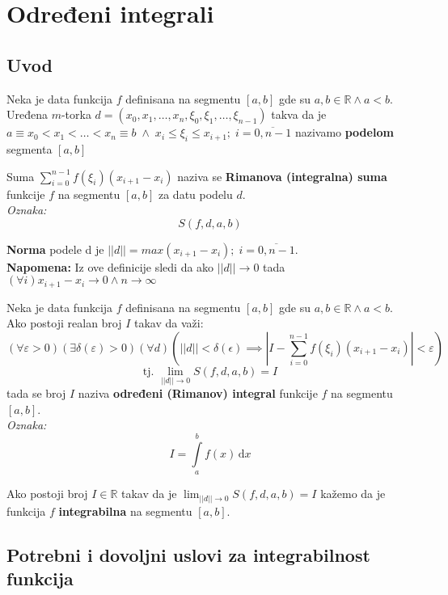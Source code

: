 \section{Određeni integrali}
\subsection{Uvod}
\begin{definition}
	Neka je data funkcija $f$ definisana na segmentu $[a, b]$ gde su $a, b \in \mathbb{R} \land a<b$. Uređena $m$-torka $d = (x_0, x_1, \ldots, x_n, \xi_0, \xi_1, \ldots, \xi_{n-1})$ takva da je $a \equiv x_0 < x_1 < \ldots < x_n \equiv b\; \land \;x_i \leq \xi_i \leq x_{i+1}; \; i=\overline{0, n-1}$ nazivamo \textbf{podelom} segmenta $[a, b]$
\end{definition}
\begin{definition}
	 Suma $\sum_{i=0}^{n-1} f(\xi_i)(x_{i+1}-x_i)$ naziva se \textbf{Rimanova (integralna) suma} funkcije $f$ na segmentu $[a, b]$ za datu podelu $d$.\\
	 \textit{Oznaka:} $$S(f, d, a, b)$$
\end{definition}
\begin{definition}
	\textbf{Norma} podele d je $||d|| = max(x_{i+1}-x_i); \; i=\overline{0,n-1}$.\\
	\textbf{Napomena:} Iz ove definicije sledi da ako $||d|| \to 0$ tada $(\forall i) x_{i+1}-x_i \to 0 \land n \to \infty$
\end{definition}
\begin{definition}
	Neka je data funkcija $f$ definisana na segmentu $[a, b]$ gde su $a, b \in \mathbb{R} \land a<b$. Ako postoji realan broj $I$ takav da važi:
	$$(\forall \varepsilon > 0)(\exists \delta(\varepsilon)>0)(\forall d)\left(||d||<\delta(\epsilon) \implies \left|I- \sum^{n-1}_{i = 0}f(\xi_i)(x_{i+1}-x_i) \right|<\varepsilon\right)$$
	$$\text{tj. } \lim_{||d||\to 0} S(f, d, a, b) = I$$ tada se broj $I$ naziva \textbf{određeni (Rimanov) integral} funkcije $f$ na segmentu $[a, b]$. \\
	\textit{Oznaka:} $$I = \int\limits^b_a f(x)\, \mathrm{d}x$$
\end{definition}
\begin{definition}
	Ako postoji broj $I\in \mathbb{R}$ takav da je $\lim_{||d||\to 0} S(f, d, a, b) = I$ kažemo da je funkcija $f$ \textbf{integrabilna} na segmentu $[a,b]$.
\end{definition}


\subsection{Potrebni i dovoljni uslovi za integrabilnost funkcija}

